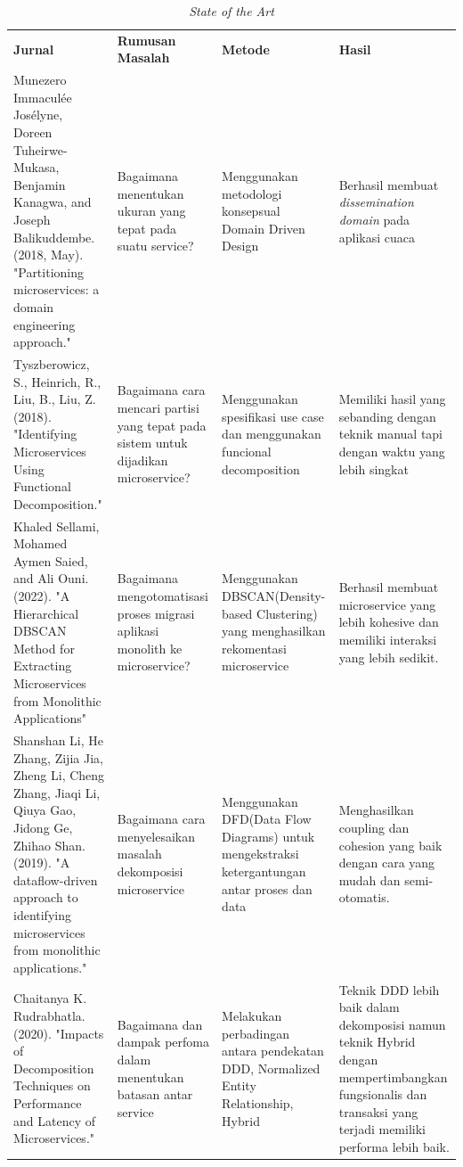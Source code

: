 \begingroup
\setlength{\LTleft}{-20cm plus -1fill}
\setlength{\LTright}{\LTleft}
\begin{small}
	\begin{longtable}{|p{3cm}|p{3.5cm}|p{3cm}|p{3.5cm}|}
		\label{tbl:StateoftheArt}\\
		\caption{\textit{State of the Art}}\\
		\hline
		\textbf{Jurnal} & \textbf{Rumusan Masalah} & \textbf{Metode} & \textbf{Hasil}\\
		\endfirsthead
		\hline
		Munezero Immaculée Josélyne, Doreen Tuheirwe-Mukasa, Benjamin Kanagwa, and Joseph Balikuddembe. (2018, May). "Partitioning microservices: a domain engineering approach." \cite{11} &
		Bagaimana menentukan ukuran yang tepat pada suatu service? &
		Menggunakan metodologi konsepsual Domain Driven Design &
		Berhasil membuat \textit{dissemination domain} pada aplikasi cuaca 
		\\
		
		\hline
		Tyszberowicz, S., Heinrich, R., Liu, B., Liu, Z. (2018). "Identifying Microservices Using Functional Decomposition." \cite{12}  & 
		Bagaimana cara mencari partisi yang tepat pada sistem untuk dijadikan microservice? &
		Menggunakan spesifikasi use case dan menggunakan funcional decomposition  &
	    Memiliki hasil yang sebanding dengan teknik manual tapi dengan waktu yang lebih singkat 
		\\

		\hline
		Khaled Sellami, Mohamed Aymen Saied, and Ali Ouni. (2022). "A Hierarchical
		DBSCAN Method for Extracting Microservices from Monolithic Applications" \cite{13} &
		Bagaimana mengotomatisasi proses migrasi aplikasi monolith ke microservice?  &
	    Menggunakan DBSCAN(Density-based Clustering) yang menghasilkan rekomentasi microservice  &
		Berhasil membuat microservice yang lebih kohesive dan memiliki interaksi yang lebih sedikit. 
		\\
		
		\hline
		Shanshan Li, He Zhang, Zijia Jia, Zheng Li, Cheng Zhang, Jiaqi Li, Qiuya Gao, Jidong Ge, Zhihao Shan. (2019). "A dataflow-driven approach to identifying microservices from monolithic applications."  \cite{14} &		  
		Bagaimana cara menyelesaikan masalah dekomposisi microservice &
		Menggunakan DFD(Data Flow Diagrams) untuk mengekstraksi ketergantungan antar proses dan data &
		Menghasilkan coupling dan cohesion yang baik dengan cara yang mudah dan semi-otomatis.
		\\

		\hline
		Chaitanya K. Rudrabhatla. (2020). "Impacts of Decomposition Techniques on Performance and Latency of Microservices."  \cite{3} &
		Bagaimana dan dampak perfoma dalam menentukan batasan antar service  &
		Melakukan perbadingan antara pendekatan DDD, Normalized Entity Relationship, Hybrid &
		Teknik DDD lebih baik dalam dekomposisi namun teknik Hybrid dengan mempertimbangkan fungsionalis dan transaksi yang terjadi memiliki performa lebih baik.
		\\
		
	\end{longtable}
\end{small}
